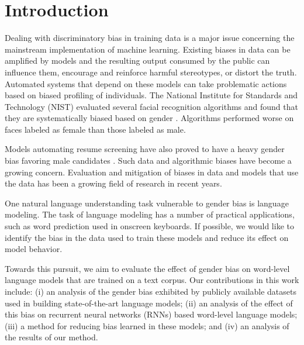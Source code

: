 \documentclass[11pt,a4paper]{article}
\newcommand{\note}[4][]{\todo[author=#2,color=#3,size=\scriptsize,fancyline,caption={},#1]{#4}} %
\newcommand{\sam}[2][]{\note[#1]{Sam}{orange!40}{#2}}
\begin{document}
\section{Introduction}

Dealing with discriminatory bias in training data is a major issue concerning the mainstream implementation of machine learning. Existing biases in  data can be amplified by models and the resulting output consumed by the public can influence them, encourage and reinforce harmful stereotypes, or distort the truth. Automated systems that depend on these models can take problematic actions based on biased profiling of individuals. The National Institute for Standards and Technology (NIST) evaluated several facial recognition algorithms and found that they are systematically biased based on gender \cite{ngan2015face}. Algorithms performed worse on faces labeled as female than those labeled as male. %


Models automating resume screening have also proved to have a heavy gender bias  favoring male candidates \citep{lambrecht2018algorithmic}. Such data and algorithmic biases have become a growing concern. Evaluation and mitigation of  biases in  data and models that use the data has been a growing field of research in recent years.

One natural language understanding task vulnerable to gender bias is language modeling. The task of language modeling has a number of practical applications, such as word prediction used in onscreen keyboards. %
If possible, we would like to identify the bias in the data used to train these models and reduce its effect on model behavior.

Towards this pursuit, we aim to evaluate the effect of gender bias on word-level language models that are trained on a text corpus.
Our contributions in this work include: (i) an analysis of the gender bias exhibited by publicly available datasets used in building state-of-the-art language models; (ii) an analysis of the effect of this bias on recurrent neural networks (RNNs) based word-level language models; (iii) a method for reducing bias learned in these models; and (iv) an analysis of the results of our method.
\end{document}
